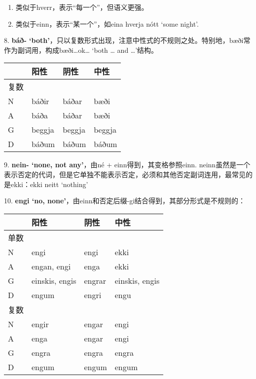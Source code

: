 \begin{enumerate}
  \def\labelenumi{\Alph{enumi}.}
  \item
        类似于hverr，表示``每一个''，但语义更强。
  \item
        类似于einn，表示``某一个''，如eina hverja nótt `some night'.
\end{enumerate}

8. \textbf{báð-
  `both‌'}，只以复数形式出现，注意中性式的不规则之处。特别地，bæði常作为副词用，构成bæði\ldots ok\ldots{}
`both \ldots{} and \ldots'结构。

\begin{longtable}{llll}
  \toprule
     & 阳性     & 阴性     & 中性     \\
  \midrule
  \endhead
  \bottomrule
  \endfoot
  复数 &        &        &        \\
  N  & báðir  & báðar  & bæði   \\
  A  & báða   & báðar  & bæði   \\
  G  & beggja & beggja & beggja \\
  D  & báðum  & báðum  & báðum  \\
\end{longtable}

9. \textbf{nein- `none, not any‌'}，由né + einn得到，其变格参照einn.
neinn虽然是一个表示否定的代词，但是它单独不能表示否定，必须和其他否定副词连用，最常见的是ekki：ekki
neitt `nothing'

10. \textbf{engi `no,
  none‌'}，由einn和否定后缀-gi结合得到，其部分形式是不规则的：

\begin{longtable}{llll}
  \toprule
     & 阳性             & 阴性     & 中性             \\
  \midrule
  \endhead
  \bottomrule
  \endfoot
  单数 &                &        &                \\
  N  & engi           & engi   & ekki           \\
  A  & engan, engi    & enga   & ekki           \\
  G  & einskis, engis & engrar & einskis, engis \\
  D  & engum          & engri  & engu           \\
  复数 &                &        &                \\
  N  & engir          & engar  & engi           \\
  A  & enga           & engar  & engi           \\
  G  & engra          & engra  & engra          \\
  D  & engum          & engum  & engum          \\
\end{longtable}

